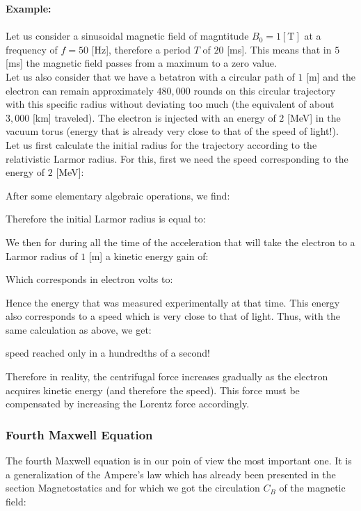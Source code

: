 	\begin{tcolorbox}[colframe=black,colback=white,sharp corners]
	\textbf{{\Large {}}Example:}\\\\
	Let us consider a sinusoidal magnetic field of magntitude $B_0=1 [\text{T}]$ at a frequency of $f=50$ [Hz], therefore a period $T$ of $20$ [ms]. This means that in $5$ [ms] the magnetic field passes from a maximum to a zero value.\\

	Let us also consider that we have a betatron with a circular path of $1$ [m] and the electron can remain approximately $480,000$ rounds on this circular trajectory with this specific radius without deviating too much (the equivalent of about $3,000$ [km] traveled). The electron is injected with an energy of $2$ [MeV] in the vacuum torus (energy that is already very close to that of the speed of light!).\\
	
	Let us first calculate the initial radius for the trajectory according to the relativistic Larmor radius. For this, first we need the speed corresponding to the energy of $2$ [MeV]:
	
	After some elementary algebraic operations, we find:
	
	Therefore the initial Larmor radius is equal to:
	
	We then for during all the time of the acceleration that will take the electron to a Larmor radius of $1$ [m] a kinetic energy gain of:
	
	Which corresponds in electron volts to:
	
	Hence the energy that was measured experimentally at that time. This energy also corresponds to a speed which is very close to that of light. Thus, with the same calculation as above, we get:
	
	speed reached only in a hundredths of a second!
	\end{tcolorbox}
	\begin{tcolorbox}[title=Remark,colframe=black,arc=10pt]
	Therefore in reality, the centrifugal force increases gradually as the electron acquires kinetic energy (and therefore the speed). This force must be compensated by increasing the Lorentz force accordingly.
	\end{tcolorbox}
	
	\subsubsection{Fourth Maxwell Equation}
	The fourth Maxwell equation is in our poin of view the most important one. It is a generalization of the Ampere's law which has already been presented in the section Magnetostatics and for which we got the circulation $C_B$ of the magnetic field:
	
